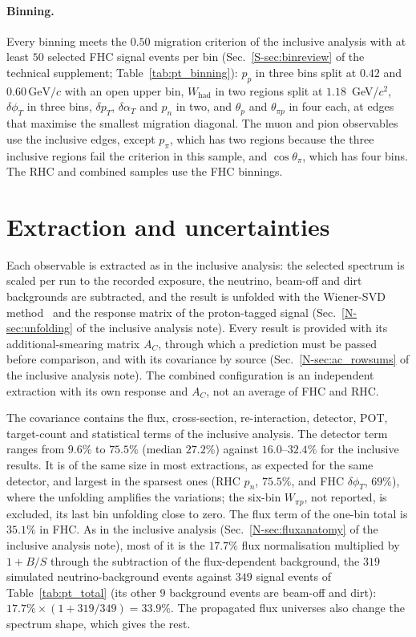 \documentclass[11pt,a4paper]{article}
\newcommand{\GeVc}{\,\text{GeV}\!/c}
\newcommand{\suppref}[2]{#1~\ref{S-#2} of the technical supplement}
\newcommand{\noteref}[2]{#1~\ref{N-#2} of the inclusive analysis note}
\begin{document}
\paragraph{Binning.} Every binning meets the $0.50$ migration criterion of the inclusive analysis
with at least $50$ selected FHC signal events per bin (\suppref{Sec.}{sec:binreview};
Table~\ref{tab:pt_binning}): $p_p$ in three bins split at $0.42$ and $0.60\GeVc$ with an open upper
bin, $W_\mathrm{had}$ in two regions split at $1.18$~GeV/$c^2$, $\delta\phi_T$ in three bins,
$\delta p_T$, $\delta\alpha_T$ and $p_n$ in two, and $\theta_p$ and $\theta_{\pi p}$ in four each,
at edges that maximise the smallest migration diagonal. The muon and pion observables use the
inclusive edges, except $p_\pi$, which has two regions because the three inclusive regions fail the
criterion in this sample, and $\cos\theta_\pi$, which has four bins. The RHC and combined samples use
the FHC binnings.



\section{Extraction and uncertainties}
\label{sec:pt_extraction}

Each observable is extracted as in the inclusive analysis: the selected spectrum is scaled per run
to the recorded exposure, the neutrino, beam-off and dirt backgrounds are subtracted, and the result
is unfolded with the Wiener-SVD method~\cite{wienervsd} and the response matrix of the proton-tagged signal
(\noteref{Sec.}{sec:unfolding}). Every result is provided with its additional-smearing matrix $A_C$,
through which a prediction must be passed before comparison, and with its covariance by source
(\noteref{Sec.}{sec:ac_rowsums}). The combined configuration is an independent extraction with its
own response and $A_C$, not an average of FHC and RHC.

The covariance contains the flux, cross-section, re-interaction, detector, POT, target-count and
statistical terms of the inclusive analysis. The detector term ranges from $9.6\%$ to $75.5\%$
(median $27.2\%$) against $16.0$--$32.4\%$ for the inclusive results. It is of the same size in most
extractions, as expected for the same detector, and largest in the sparsest ones (RHC $p_n$, $75.5\%$,
and FHC $\delta\phi_T$, $69\%$), where the unfolding amplifies the variations; the six-bin
$W_{\pi p}$, not reported, is excluded, its last bin unfolding close to zero. The flux term
of the one-bin total is $35.1\%$ in FHC. As in the inclusive analysis (\noteref{Sec.}{sec:fluxanatomy}),
most of it is the $17.7\%$ flux normalisation multiplied by $1+B/S$ through the subtraction of the
flux-dependent background, the $319$ simulated neutrino-background events against $349$ signal events of
Table~\ref{tab:pt_total} (its other $9$ background events are beam-off and dirt): $17.7\%\times(1+319/349)
=33.9\%$. The propagated flux universes also change the spectrum shape, which gives the rest.
\end{document}

